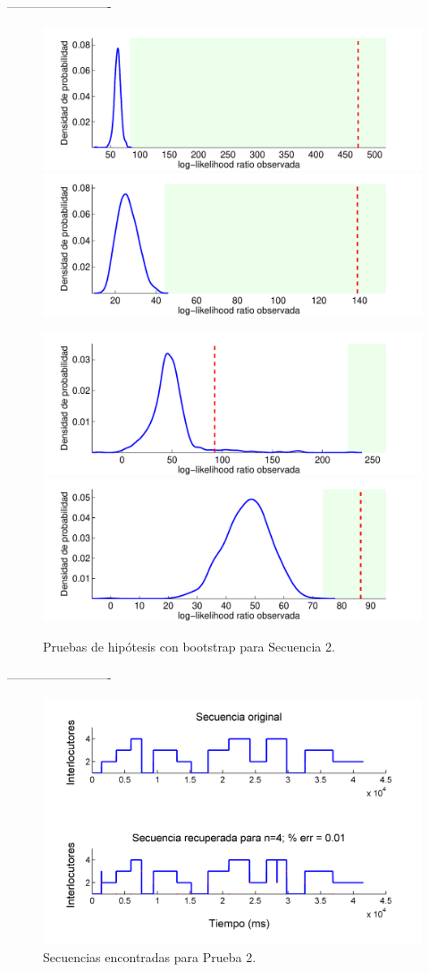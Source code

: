 -------------------------

\begin{figure}[H]
  \centerline  
  {\includegraphics[width=0.6\linewidth]{gfx/chap6/soledadboot1}
   \includegraphics[width=0.6\linewidth]{gfx/chap6/soledadboot2} }
  \centerline  
  {\includegraphics[width=0.6\linewidth]{gfx/chap6/soledadboot3}
   \includegraphics[width=0.6\linewidth]{gfx/chap6/soledadboot4}
  } \quad
  \caption{Pruebas de hipótesis con bootstrap para Secuencia 2.}
  \label{fig:prb1_boot}
\end{figure}

-------------------------

\begin{figure}[H]
  \centerline
  {\includegraphics[width=0.8\linewidth]{gfx/chap6/soledad1_}} \quad
  \caption{Secuencias encontradas para Prueba 2.}
  \label{fig:prb1_seq}
\end{figure}

